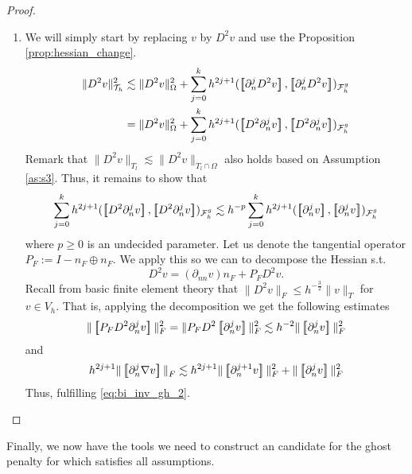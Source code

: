 \begin{proof}
\begin{enumerate}[label=\arabic*)]
    \item We will simply start by replacing $v$  by $D^2 v$ and use the Proposition \ref{prop:hessian_change}.
        \[
            \begin{split}
                    \| D^2 v \|_{ \mathcal{T} _{h} }^{2  }&  \lesssim \| D^2 v \|_{ \Omega  }^{ 2 }  + \sum_{j=0}^{k} h^{2j+1} ( \jump{   \partial ^{j}_{n} D^2 v }, \jump{  \partial ^{j}_{n} D^2 v}    )_{\mathcal{F}_{h}^{g}} \\
                    &=  \| D^2 v \|_{ \Omega  }^{ 2 }  + \sum_{j=0}^{k} h^{2j+1} ( \jump{   D^2 \partial ^{j}_{n}  v }, \jump{  D^2 \partial ^{j}_{n}  v}    )_{\mathcal{F}_{h}^{g}}
            \end{split}
        \]
        Remark that $\|  D^2 v \|_{ T_{l} }^{  } \lesssim  \|  D^2 v \|_{ T_{l} \cap \Omega  }^{  }  $ also holds based on Assumption \ref{as:s3}.
        Thus, it remains to show that \[
        \sum_{j=0}^{k} h^{2j+1} ( \jump{   D^2 \partial ^{j}_{n}  v }, \jump{  D^2 \partial ^{j}_{n}  v}    )_{\mathcal{F}_{h}^{g}} \lesssim h^{-p} \sum_{j=0}^{k} h^{2j+1} ( \jump{    \partial ^{j}_{n}  v }, \jump{  \partial ^{j}_{n}  v}    )_{\mathcal{F}_{h}^{g}}
        \]
        where $p \ge  0 $ is an undecided parameter.
        Let us denote the tangential operator $P_{F} := I - n_{F} \oplus n_{F} $. We apply this so we can to decompose the Hessian s.t. \[
        D^2 v = ( \partial _{nn}v)n_{F} + P_{F} D^2 v.
        \]
        Recall from basic finite element theory that $\| D^2v \|_{F  }^{  }\le h^{-\frac{3}{2}} \| v \|_{ T }^{  }    $ for $v \in  V_{h}$.
        That is, applying the decomposition we get the following estimates \[
        \| \jump{ P_{F}   D^2 \partial _{n}^{j} v }\|_{ F }^{ 2 } = \| P_{F} D^2 \jump{ \partial _{n}^{j} v }   \|_{ F  }^{ 2} \lesssim h^{-2} \|  \jump{ \partial ^{j}_{n} v }   \|_{ F }^{  2}
        \]
        and \[
            h^{2j +1} \| \jump{\partial ^{j}_{n} \nabla v}  \|_{ F }^{  } \lesssim h^{2j +1 } \| \jump{ \partial ^{j+1}_{n} v }   \|_{F  }^{ 2 } + \| \jump{ \partial ^{j}_{n}v }   \|_{ F }^{ 2 }
        \]
        Thus, fulfilling \eqref{eq:bi_inv_gh_2}.

    \end{enumerate}

\end{proof}



Finally, we now have the tools we need to construct an candidate for the ghost penalty for which satisfies all assumptions.

